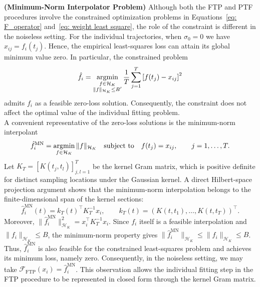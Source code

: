 \begin{remark}\textup{\textbf{(Minimum-Norm Interpolator Problem)}}
    Although both the FTP and PTF procedures involve the constrained optimization
    problems in Equations~\eqref{eq: F_operator} and~\eqref{eq: weight least square},
    the role of the constraint is different in the noiseless setting. For the
    individual trajectories, when $\sigma_0=0$ we have
    $x_{ij}=f_i(t_j)$. Hence, the empirical least-squares loss can attain its
    global minimum value zero. In particular, the constrained problem
    \[
    \hat f_i
    =
    \operatorname*{argmin}_{\substack{f\in\mathcal H_K\\
    \|f\|_{\mathcal H_K}\le B'}}
    \frac{1}{T}\sum_{j=1}^T
    \left[f(t_j)-x_{ij}\right]^2
    \]
    admits $f_i$ as a feasible zero-loss solution. Consequently, the constraint
    does not affect the optimal value of the individual fitting problem.\vspace{1em}\\
    A convenient representative of the zero-loss solutions is the
    minimum-norm interpolant
    \begin{equation}
    \hat f_i^{\mathrm{MN}}
    =
    \operatorname*{argmin}_{f\in\mathcal H_K}
    \|f\|_{\mathcal H_K}
    \quad
    \text{subject to}
    \quad
    f(t_j)=x_{ij},\qquad j=1,\ldots,T.
    \label{eq: minimum norm interpolator}
    \end{equation}
    Let $K_T=\left[K(t_j,t_l)\right]_{j,l=1}^T$ be the kernel Gram matrix, which is positive definite for distinct sampling locations under the Gaussian kernel. A direct Hilbert-space projection argument shows that the minimum-norm interpolation belongs to the finite-dimensional span of the kernel sections:
    \[
    \hat f_i^{\mathrm{MN}}(t)
    =
    k_T(t)^\top K_T^{-1}x_i,
    \qquad
    k_T(t)
    =
    \left(K(t,t_1),\ldots,K(t,t_T)\right)^\top.
    \]
    Moreover, $\|\hat f_i^{\mathrm{MN}}\|_{\mathcal H_K}^2=x_i^\top K_T^{-1}x_i$. Since $f_i$ itself is a feasible interpolation and
    $\|f_i\|_{\mathcal H_K}\le B$, the minimum-norm property gives
    $\|\hat f_i^{\mathrm{MN}}\|_{\mathcal H_K}
    \le
    \|f_i\|_{\mathcal H_K}
    \le B$. Thus, $\hat f_i^{\mathrm{MN}}$ is also feasible for the constrained
    least-squares problem and achieves its minimum loss, namely zero.
    Consequently, in the noiseless setting, we may take
    $\mathcal F_{\mathrm{FTP}}(x_i)
    =
    \hat f_i^{\mathrm{MN}}$. This observation allows the individual fitting step in the FTP procedure to be represented in closed form through the kernel Gram matrix.
\end{remark}